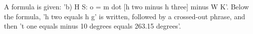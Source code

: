 A formula is given: 'b) H S: o = m dot [h two minus h three] minus W K'. Below the formula, 'h two equals h g' is written, followed by a crossed-out phrase, and then 't one equals minus 10 degrees equals 263.15 degrees'.